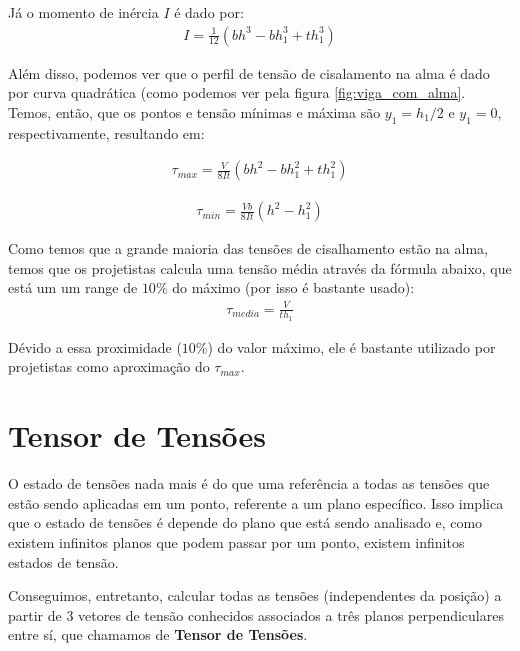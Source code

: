 \documentclass{article}
\begin{document}
Já o momento de inércia $I$ é dado por:
\begin{align}
    I = \frac{1}{12}\left(bh^3 - bh_1^3 + th_1^3\right)
\end{align}

Além disso, podemos ver que o perfil de tensão de cisalamento na alma é dado por curva quadrática (como podemos ver pela figura \ref{fig:viga_com_alma}. Temos, então, que os pontos e tensão mínimas e máxima são $y_1 = h_1/2$ e $y_1 = 0$, respectivamente, resultando em:

\begin{minipage}{0.45\textwidth}
    \begin{align}
        \tau_{max} = \frac{V}{8It} (bh^2 - bh_1^2 + th_1^2)
    \end{align}
\end{minipage}
\begin{minipage}{0.45\textwidth}
    \begin{align}
        \tau_{min} = \frac{Vb}{8It} (h^2 - h_1^2)
    \end{align}
\end{minipage}

\vspace{15px}
 Como temos que a grande maioria das tensões de cisalhamento estão na alma, temos que os projetistas calcula uma tensão média através da fórmula abaixo, que está um um range de $10\%$ do máximo (por isso é bastante usado):
 \begin{align}
     \tau_{media} = \frac{V}{th_1}
 \end{align}

 Dévido a essa proximidade ($10\%$) do valor máximo, ele é bastante utilizado por projetistas como aproximação do $\tau_{max}$.
 
 \newpage
 \section{Tensor de Tensões}

 O estado de tensões nada mais é do que uma referência a todas as tensões que estão sendo aplicadas em um ponto, referente a um plano específico. Isso implica que o estado de tensões é depende do plano que está sendo analisado e, como existem infinitos planos que podem passar por um ponto, existem infinitos estados de tensão. 

 Conseguimos, entretanto, calcular todas as tensões (independentes da posição) a partir de 3 vetores de tensão conhecidos associados a três planos perpendiculares entre sí, que chamamos de \textbf{Tensor de Tensões}.
\end{document}
